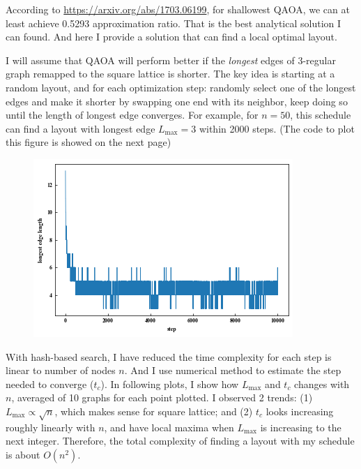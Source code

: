 \documentclass{article}
\begin{document}
According to \url{https://arxiv.org/abs/1703.06199}, for shallowest QAOA, we can at least achieve 0.5293 approximation ratio. That is the best analytical solution I can found. And here I provide a solution that can find a local optimal layout.

I will assume that QAOA will perform better if the \textit{longest} edges of 3-regular graph remapped to the square lattice is shorter. The key idea is starting at a random layout, and for each optimization step: randomly select one of the longest edges and make it shorter by swapping one end with its neighbor, keep doing so until the length of longest edge converges. For example, for $n=50$, this schedule can find a layout with longest edge $L_{\text{max}}=3$ within 2000 steps. (The code to plot this figure is showed on the next page)
\begin{figure}[h]
    \centering
    \includegraphics[width=0.5\linewidth]{figt2-1.png}
\end{figure}

With hash-based search, I have reduced the time complexity for each step is linear to number of nodes $n$. And I use numerical method to estimate the step needed to converge ($t_c$). In following plots, I show how $L_{\text{max}}$ and $t_c$ changes with $n$, averaged of 10 graphs for each point plotted. I observed 2 trends: (1) $L_{\text{max}}\propto \sqrt{n}$, which makes sense for square lattice; and (2) $t_c$ looks increasing roughly linearly with $n$, and have local maxima when $L_{\text{max}}$ is increasing to the next integer. Therefore, the total complexity of finding a layout with my schedule is about $O(n^2)$.
\end{document}
